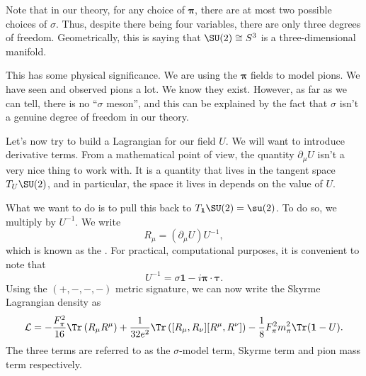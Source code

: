 \documentclass[a4paper]{article}
\begin{document}
%
%

Note that in our theory, for any choice of $\boldsymbol\pi$, there are at most two possible choices of $\sigma$. Thus, despite there being four variables, there are only three degrees of freedom. Geometrically, this is saying that $\SU(2) \cong S^3$ is a three-dimensional manifold.

This has some physical significance. We are using the $\boldsymbol\pi$ fields to model pions. We have seen and observed pions a lot. We know they exist. However, as far as we can tell, there is no ``$\sigma$ meson'', and this can be explained by the fact that $\sigma$ isn't a genuine degree of freedom in our theory.

Let's now try to build a Lagrangian for our field $U$. We will want to introduce derivative terms. From a mathematical point of view, the quantity $\partial_\mu U$ isn't a very nice thing to work with. It is a quantity that lives in the tangent space $T_U \SU(2)$, and in particular, the space it lives in depends on the value of $U$.

What we want to do is to pull this back to $T_\mathbf{1} \SU(2) = \su(2)$. To do so, we multiply by $U^{-1}$. We write
\[
  R_\mu = (\partial_\mu U)U^{-1},
\]
which is known as the . For practical, computational purposes, it is convenient to note that
\[
  U^{-1} = \sigma \mathbf{1} - i \boldsymbol\pi \cdot \boldsymbol\tau.
\]
Using the $(+, -, -, -)$ metric signature, we can now write the Skyrme Lagrangian density as
\[
  \mathcal{L} =-\frac{F_{\pi}^2 }{16} \Tr \left( R_\mu R^\mu\right) +\frac{1}{32e^2}\Tr\left([R_\mu, R_\nu][R^\mu, R^\nu]\right) - \frac{1}{8} F_\pi^2 m_\pi^2 \Tr(\mathbf{1} - U).
\]
The three terms are referred to as the $\sigma$-model term, Skyrme term and pion mass term respectively.
\end{document}

